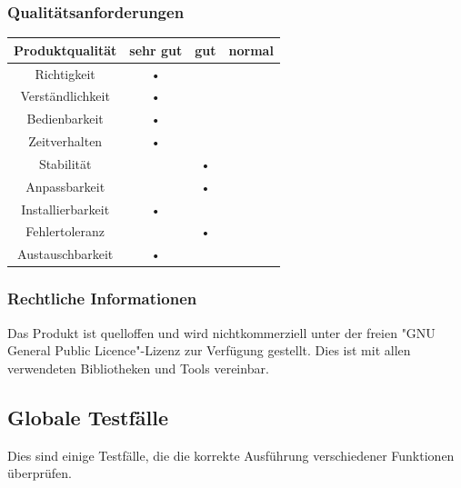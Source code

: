 \subsubsection{Qualitätsanforderungen}
\begin{center}
\begin{tabular}{|c|c|c|c|}
\hline 
\textbf{Produktqualität} & \textbf{sehr gut} & \textbf{gut} & \textbf{normal} \\ 
\hline 
Richtigkeit & • && \\ 
\hline 
Verständlichkeit & • & & \\ 
\hline 
Bedienbarkeit & • & & \\ 
\hline 
Zeitverhalten & • & & \\ 
\hline 
Stabilität & & • & \\ 
\hline 
Anpassbarkeit & & • & \\ 
\hline 
Installierbarkeit & • & & \\ 
\hline 
Fehlertoleranz & & • & \\ 
\hline 
Austauschbarkeit & • & & \\ 
\hline 
\end{tabular}
\end{center}


\subsubsection{Rechtliche Informationen}
Das Produkt ist quelloffen und wird nichtkommerziell unter der freien "GNU General Public Licence"-Lizenz zur Verfügung gestellt. Dies ist mit allen verwendeten Bibliotheken und Tools vereinbar.

\subsection{Globale Testfälle}
Dies sind einige Testfälle, die die korrekte Ausführung verschiedener Funktionen überprüfen.

